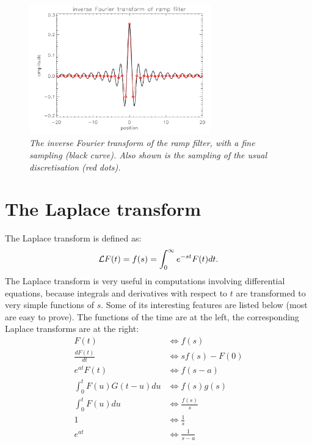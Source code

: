 \documentclass[11pt,oneside]{book}
\begin{document}
\begin{figure}[tb]
\centering
\includegraphics[width=0.7\textwidth]{figs/fig_rampfilter_app.pdf}
\caption{\label{fig:rampapp} \emph{The inverse Fourier transform of
    the ramp filter, with a fine sampling (black curve). Also shown is
    the sampling of the usual discretisation (red dots).}}
\end{figure}


\newpage
\section{The Laplace transform} \label{app:laplace}
The Laplace transform is defined as:
\begin{equation}
  {\cal L} F(t) = f(s) = \int_0^\infty e^{-st} F(t) dt.
\end{equation}
%
The Laplace transform is very useful in computations involving differential
equations, because integrals and derivatives with respect to $t$ are
transformed to very simple functions of $s$. Some of its interesting features
are listed below (most are easy to prove). The functions of the time are at
the left, the corresponding Laplace transforms are at the right:
\begin{align}
F(t)                        & \Longleftrightarrow f(s) \\
\frac{dF(t)}{dt}            & \Longleftrightarrow s f(s) - F(0) \\
e^{at} F(t)                 & \Longleftrightarrow f(s - a)\\
\int_0^t F(u) G(t - u) du   & \Longleftrightarrow f(s) g(s) \label{eq:lap1}\\
\int_0^t F(u) du            & \Longleftrightarrow \frac{f(s)}{s}\\
1                           & \Longleftrightarrow \frac{1}{s}\\
e^{at}                      & \Longleftrightarrow \frac{1}{s - a} \label{eq:lap2}
\end{align}
\end{document}
